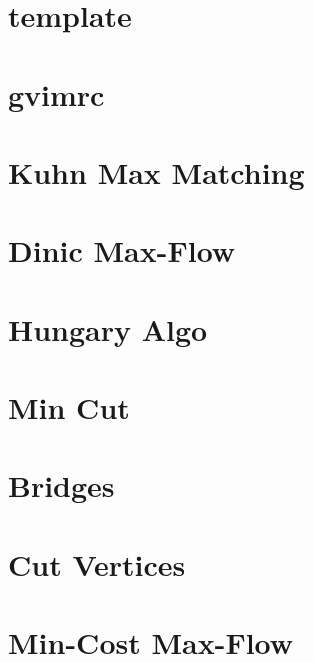 \documentclass[10pt]{article}
\begin{document}
\section{template}

\section{gvimrc}

\section{Kuhn Max Matching}

\section{Dinic Max-Flow}

\section{Hungary Algo}

\section{Min Cut}

\section{Bridges}

\section{Cut Vertices}

\section{Min-Cost Max-Flow}

\end{document}
